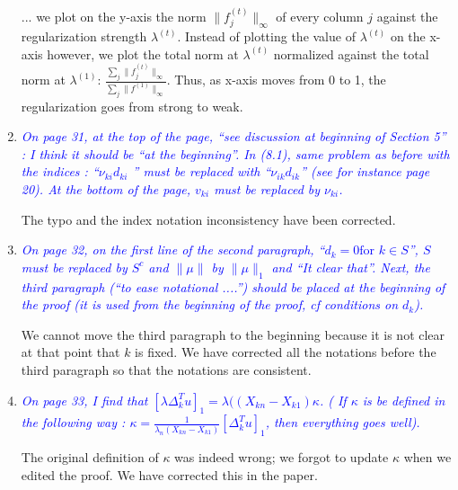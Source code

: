 \documentclass[pdftex,12pt]{article}
\def\rc#1{{\it\textcolor{blue}{#1}}\smallskip}
\begin{document}
\begin{enumerate}
... we plot on the y-axis the norm $\|f^{(t)}_j\|_{\infty}$ of every column $j$ against the regularization strength $\lambda^{(t)}$. Instead of plotting the value of $\lambda^{(t)}$ on the x-axis however, we plot the total norm at $\lambda^{(t)}$ normalized against the total norm at $\lambda^{(1)}$: $\frac{\sum_j \|f^{(t)}_j\|_{\infty}}{\sum_j \|f^{(1)}\|_{\infty}}$. Thus, as x-axis moves from 0 to 1, the regularization goes from strong to weak.

\item \rc{On page 31, at the top of the page, ``see discussion at beginning of
Section 5'' : I think it should be ``at the beginning''. In (8.1),
same problem as before with the indices : ``$\nu_{ki} d_{ki}$ '' must be replaced
with ``$\nu_{ik}d_{ik}$'' (see for instance page 20). At the bottom of the page,
$v_{ki}$ must be replaced by $\nu_{ki}$.} 

The typo and the index notation inconsistency have been corrected.

\item \rc{On page 32, on the first line of the second paragraph, ``$d_k = 0 \mbox{for $k
\in S$}$'', $S$ must be replaced by $S^c$ and $\|\mu\|$ by $\|\mu\|_1$ and ``It clear
that''. Next, the third paragraph (``to ease notational ....'') should
be placed at the beginning of the proof (it is used from the beginning
of the proof, cf conditions on $d_k$).}

We cannot move the third paragraph to the beginning because it is not clear at that point that $k$ is fixed. We have corrected all the notations before the third paragraph so that the notations are consistent.

\item \rc{On page 33, I find that $[\lambda\Delta_k^Tu]_1 = \lambda((X_{kn} −X_{k1})\kappa$. ( If $\kappa$ is be defined
in the following way : $\kappa = \frac{1}{\lambda_n(X_{kn}-X_{k1})}[\Delta_k^T u]_1$, then everything
goes well).}

The original definition of $\kappa$ was indeed wrong; we forgot to update $\kappa$ when we edited the proof. We have corrected this in the paper.




\end{enumerate}
\end{document}
